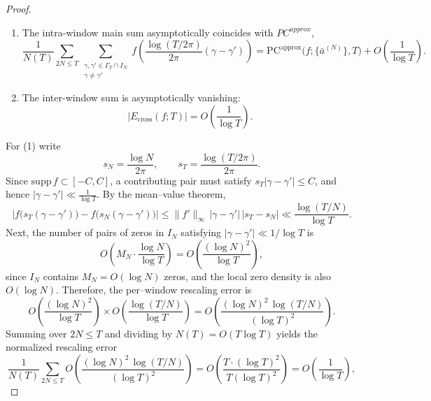 \documentclass[12pt,reqno]{amsart}
\theoremstyle{plain}
\theoremstyle{definition}
\theoremstyle{remark}
\begin{document}
\begin{proof}
\begin{enumerate}
\item The intra-window main sum asymptotically coincides with $PC^{approx}$, \begin{equation}
\frac{1}{N(T)}\sum_{2N\le T}
\!\!\sum_{\substack{\gamma,\gamma'\in\Gamma_T\cap I_N\\ \gamma\ne\gamma'}}
f\!\left(\frac{\log(T/2\pi)}{2\pi}(\gamma-\gamma')\right)
=
\mathrm{PC}^{\mathrm{approx}}\!\bigl(f;\{\bar a^{(N)}\},T\bigr)
+O\!\left(\frac{1}{\log T}\right).
\end{equation}
\item The inter-window sum is asymptotically vanishing: 
\begin{equation}
|E_{\mathrm{cross}}(f;T)|= O \left( \frac{1}{\log T}\right ).
\end{equation}
\end{enumerate}
For (1) write
\begin{equation}
s_N=\frac{\log N}{2\pi},\qquad s_T=\frac{\log(T/2\pi)}{2\pi}.
\end{equation}
Since $\mathrm{supp}\,f\subset[-C,C]$,
a contributing pair must satisfy $s_T|\gamma-\gamma'|\le C$, and hence
$|\gamma-\gamma'|\ll \frac{1}{\log T}$. By the mean–value theorem,
\begin{equation}
\Big|f\!\big(s_T(\gamma-\gamma')\big)-f\!\big(s_N(\gamma-\gamma')\big)\Big|
\le \|f'\|_\infty\,|\gamma-\gamma'|\,|s_T-s_N|
\ll \frac{\log(T/N)}{\log T}.
\end{equation}
Next, the number of pairs of zeros in $I_N$ satisfying $|\gamma - \gamma'| \ll 1/\log T$ is 
\begin{equation}
O\!\left(M_N \cdot \frac{\log N}{\log T}\right)
= O\!\left(\frac{(\log N)^2}{\log T}\right),
\end{equation}
since $I_N$ contains $M_N = O(\log N)$ zeros, and the local zero density is also $O(\log N)$.
Therefore, the per–window rescaling error is 
\begin{equation}
O\!\left(\frac{(\log N)^2}{\log T}\right)
\times
O\!\left(\frac{\log(T/N)}{\log T}\right)
= O\!\left(\frac{(\log N)^2 \, \log(T/N)}{(\log T)^2}\right).
\end{equation}
Summing over $2N \le T$ and dividing by $N(T) = O(T \log T)$ yields the normalized
rescaling error
\begin{equation}
\frac{1}{N(T)} \sum_{2N \le T}
O\!\left(\frac{(\log N)^2 \, \log(T/N)}{(\log T)^2}\right)
= O\!\left(\frac{T \cdot (\log T)^2}{T (\log T)^2}\right)
= O\!\left(\frac{1}{\log T}\right),
\end{equation}

\end{proof}
\end{document}
